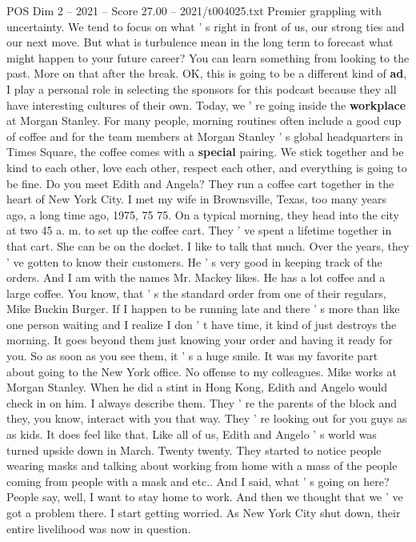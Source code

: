 \begin{textsample}{POS Dim 2 – 2021 – Score 27.00 – 2021/t004025.txt}
Premier grappling with uncertainty.
We tend to focus on what ' s right in front of us, our strong ties and our next move.
But what is turbulence mean in the long term to forecast what might happen to your future career?
You can learn something from looking to the past.
More on that after the break.
OK, this is going to be a different kind of \textbf{ad}, I play a personal role in selecting the sponsors for this podcast because they all have interesting cultures of their own.
Today, we ' re going inside the \textbf{workplace} at Morgan Stanley.
For many people, morning routines often include a good cup of coffee and for the team members at Morgan Stanley ' s global headquarters in Times Square, the coffee comes with a \textbf{special} pairing.
We stick together and be kind to each other, love each other, respect each other, and everything is going to be fine.
Do you meet Edith and Angela?
They run a coffee cart together in the heart of New York City.
I met my wife in Brownsville, Texas, too many years ago, a long time ago, 1975, 75 75.
On a typical morning, they head into the city at two 45 a. m. to set up the coffee cart.
They ' ve spent a lifetime together in that cart.
She can be on the docket.
I like to talk that much.
Over the years, they ' ve gotten to know their customers.
He ' s very good in keeping track of the orders.
And I am with the names Mr.
Mackey likes.
He has a lot coffee and a large coffee.
You know, that ' s the standard order from one of their regulars, Mike Buckin Burger.
If I happen to be running late and there ' s more than like one person waiting and I realize I don ' t have time, it kind of just destroys the morning.
It goes beyond them just knowing your order and having it ready for you.
So as soon as you see them, it ' s a huge smile.
It was my favorite part about going to the New York office.
No offense to my colleagues.
Mike works at Morgan Stanley.
When he did a stint in Hong Kong, Edith and Angelo would check in on him.
I always describe them.
They ' re the parents of the block and they, you know, interact with you that way.
They ' re looking out for you guys as as kids.
It does feel like that.
Like all of us, Edith and Angelo ' s world was turned upside down in March.
Twenty twenty.
They started to notice people wearing masks and talking about working from home with a mass of the people coming from people with a mask and etc..
And I said, what ' s going on here?
People say, well, I want to stay home to work.
And then we thought that we ' ve got a problem there.
I start getting worried.
As New York City shut down, their entire livelihood was now in question.

\end{textsample}
